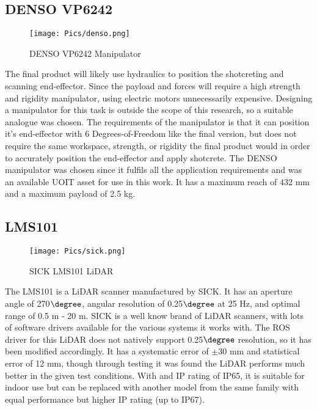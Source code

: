 \subsection{DENSO VP6242}
\begin{figure}[H]
    \centering
    \texttt{[image: Pics/denso.png]}
    \caption{DENSO VP6242 Manipulator \cite{densopage}}
    \label{fig:densofig}
\end{figure}
The final product will likely use hydraulics to position the shotcreting and scanning end-effector. Since the payload and forces will require a high strength and rigidity manipulator, using electric motors unnecessarily expensive. Designing a manipulator for this task is outside the scope of this research, so a suitable analogue was chosen. The requirements of the manipulator is that it can position it's end-effector with 6 Degrees-of-Freedom like the final version, but does not require the same workspace, strength, or rigidity the final product would in order to accurately position the end-effector and apply shotcrete. The DENSO manipulator was chosen since it fulfils all the application requirements and was an available UOIT asset for use in this work. It has a maximum reach of 432 mm and a maximum payload of 2.5 kg.\\ 
\subsection{LMS101}

\begin{figure}[H]
    \centering
    \texttt{[image: Pics/sick.png]}
    \caption{SICK LMS101 LiDAR \cite{sickpage}}
    \label{fig:sick}
\end{figure}
The LMS101 is a LiDAR scanner manufactured by SICK. It has an aperture angle of 270$\degree$, angular resolution of 0.25$\degree$ at 25 Hz, and optimal range of 0.5 m - 20 m. SICK is a well know brand of LiDAR scanners, with lots of software drivers available for the various systems it works with. The ROS driver for this LiDAR does not natively support 0.25$\degree$ resolution, so it has been modified accordingly. It has a systematic error of $\pm$30 mm and statistical error	of 12 mm, though through testing it was found the LiDAR performs much better in the given test conditions. With and IP rating of IP65, it is suitable for indoor use but can be replaced with another model from the same family with equal performance but higher IP rating (up to IP67).\\
